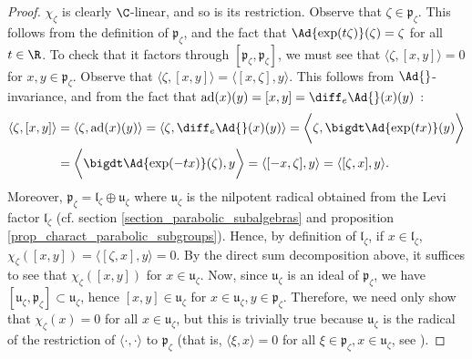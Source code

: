\begin{proof}
    \(\chi_\zeta\) is clearly \(\C\)-linear, and so is its restriction. Observe that \(\zeta \in \mathfrak{p}_\zeta\). This follows from the definition of \(\mathfrak{p}_\zeta\), and the fact that \(\Ad{\exp(t\zeta)}(\zeta)=\zeta\) for all \(t \in \R\). To check that it factors through \([\mathfrak{p}_\zeta, \mathfrak{p}_\zeta]\), we must see that \(\langle \zeta, [x, y]\rangle =0\) for \(x,y \in \mathfrak{p}_\zeta\). Observe that \(\langle \zeta, [x,y]\rangle = \langle [x,\zeta], y \rangle\). This follows from \(\Ad{}\)-invariance, and from the fact that \(\mathrm{ad}(x)(y)=[x,y]=\diff_e \Ad{}(x)(y)\) \parencite[Th. 20.27]{lee_introSM}:
    \begin{align*}
        \langle \zeta, [x,y] \rangle & = \langle \zeta, \mathrm{ad}(x)(y) \rangle = \langle \zeta, \diff_e \Ad{}(x)(y) \rangle = \bigg\langle \zeta, \bigdt \Ad{\exp(tx)}(y) \bigg\rangle  \\
        & = \bigg\langle \bigdt \Ad{\exp(-tx)}(\zeta), y \bigg \rangle =\langle [-x,\zeta], y\rangle = \langle [\zeta,x], y \rangle.
    \end{align*}
    Moreover, \(\mathfrak{p}_\zeta=\mathfrak{l}_\zeta \oplus \mathfrak{u}_\zeta\) where \(\mathfrak{u}_\zeta\) is the nilpotent radical obtained from the Levi factor \(\mathfrak{l}_\zeta\) (cf. section \ref{section_parabolic_subalgebras} and proposition \ref{prop_charact_parabolic_subgroups}). Hence, by definition of \(\mathfrak{l}_\zeta\), if \(x \in \mathfrak{l}_\zeta\), \(\chi_\zeta([x,y])=\langle [\zeta,x], y \rangle =0\). By the direct sum decomposition above, it suffices to see that \(\chi_\zeta([x,y])\) for \(x \in \mathfrak{u}_\zeta\). Now, since \(\mathfrak{u}_\zeta\) is an ideal of \(\mathfrak{p}_\zeta\), we have \([\mathfrak{u}_\zeta, \mathfrak{p}_\zeta] \subset \mathfrak{u}_\zeta\), hence \([x,y]\in \mathfrak{u}_\zeta\) for \(x\in \mathfrak{u}_\zeta, y \in \mathfrak{p}_\zeta\). Therefore, we need only show that \(\chi_\zeta(x)=0\) for all \(x \in \mathfrak{u}_\zeta\), but this is trivially true because \(\mathfrak{u}_\zeta\) is the radical of the restriction of \(\langle \cdot, \cdot  \rangle\) to \(\mathfrak{p}_\zeta\) (that is, \(\langle \xi, x\rangle=0\) for all \(\xi \in \mathfrak{p}_\zeta, x \in \mathfrak{u}_\zeta\), see \parencite[Page 273]{knapp2013lie}).
\end{proof}

